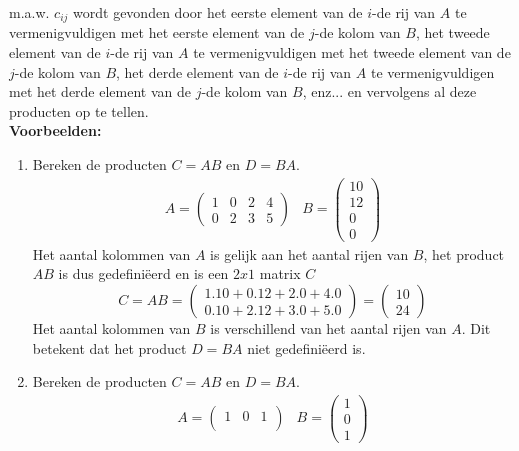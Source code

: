 m.a.w. $c_{ij}$ wordt gevonden door het eerste element van de $i$-de rij van $A$ te vermenigvuldigen met het eerste element van de $j$-de kolom van $B$, het tweede element van de $i$-de rij van $A$ te vermenigvuldigen met het tweede element van de $j$-de kolom van $B$, het derde element van de $i$-de rij van $A$ te vermenigvuldigen met het derde element van de $j$-de kolom van $B$, enz... en vervolgens al deze producten op te tellen.\\

{\bf Voorbeelden:}\\

\begin{enumerate}
	\item 
	Bereken de producten $C=AB$ en $D=BA$.
	\[
	\begin{array}{ll}
		A=\left( \begin{matrix}
			1 & 0 & 2 & 4 \\
			0 & 2 & 3 & 5 \end{matrix} \right) &
		B=\left( \begin{matrix}
			10 \\ 12 \\ 0 \\ 0
		\end{matrix} \right)
	\end{array}	
	\]
	Het aantal kolommen van $A$ is gelijk aan het aantal rijen van $B$, het product $AB$ is dus gedefini\"{e}erd en is een $2x1$ matrix $C$
	\[
	C=AB=\left( \begin{matrix} 
	1.10+0.12+2.0+4.0 \\
	0.10+2.12+3.0+5.0 \end{matrix} \right)=
	\left( \begin{matrix}
	10 \\ 24
	\end{matrix} \right)
	\]
	Het aantal kolommen van $B$ is verschillend van het aantal rijen van $A$. Dit betekent dat het product $D=BA$ niet gedefini\"{e}erd is.
	\item
	Bereken de producten $C=AB$ en $D=BA$.
	\[
	\begin{array}{ll}
	A=\left( \begin{matrix}
	1 & 0 & 1 \\
	\end{matrix} \right) &
	B=\left( \begin{matrix}
	1 \\ 0 \\ 1
	\end{matrix} \right)
	\end{array}	
\]
\end{enumerate}
